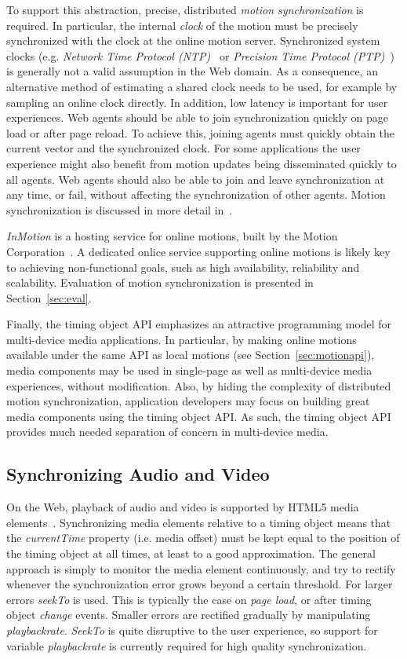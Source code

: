 To support this abstraction, precise, distributed \emph{motion
synchronization} is required. In particular, the internal \emph{clock} of the
motion must be precisely synchronized with the clock at the online motion
server. Synchronized system clocks (e.g. \emph{Network Time Protocol (NTP)}~\cite{ntp} or \emph{Precision Time Protocol (PTP)}~\cite{ptp}) is
generally not a valid assumption in the Web domain.  As a consequence, an
alternative method of estimating a shared clock needs to be used, for example
by sampling an online clock directly. In addition, low latency is important
for user experiences. Web agents should be able to join synchronization
quickly on page load or after page reload. To achieve this, joining agents
must quickly obtain the current vector and the synchronized clock. For some
applications the user experience might also benefit from motion updates being
disseminated quickly to all agents. Web agents should also be able to join and
leave synchronization at any time, or fail, without affecting the
synchronization of other agents. Motion synchronization is discussed in more
detail in~\cite{msv}.

\emph{InMotion} is a hosting service for online motions, built by the Motion Corporation~\cite{mcorp}. A dedicated onlice service supporting
online motions is likely key to achieving non-functional goals, such as
high availability, reliability and scalability. Evaluation of
motion synchronization is presented in Section~\ref{sec:eval}.

Finally, the timing object API emphasizes an attractive programming model for
multi-device media applications. In particular, by making online motions
available under the same API as local motions (see Section~\ref{sec:motionapi}),
media components may be used in single-page as well as multi-device media
experiences, without modification. Also, by hiding the complexity of
distributed motion synchronization, application developers may focus on
building great media components using the timing object API. As such, the
timing object API provides much needed separation of concern in multi-device
media.

\subsection{Synchronizing Audio and Video}
\label{sec:avsync}

On the Web, playback of audio and video is supported by HTML5 media
elements~\cite{html5media}. Synchronizing media elements relative to a timing
object means that the \emph{currentTime} property (i.e. media offset) must be
kept equal to the position of the timing object at all times, at least to a
good approximation. The general approach is simply to monitor the media
element continuously, and try to rectify whenever the synchronization error
grows beyond a certain threshold. For larger errors \emph{seekTo} is used. This is
typically the case on \emph{page load}, or after timing object \emph{change} events. Smaller
errors are rectified gradually by manipulating \emph{playbackrate}. \emph{SeekTo} is
quite disruptive to the user experience, so support for variable \emph{playbackrate}
is currently required for high quality synchronization.

